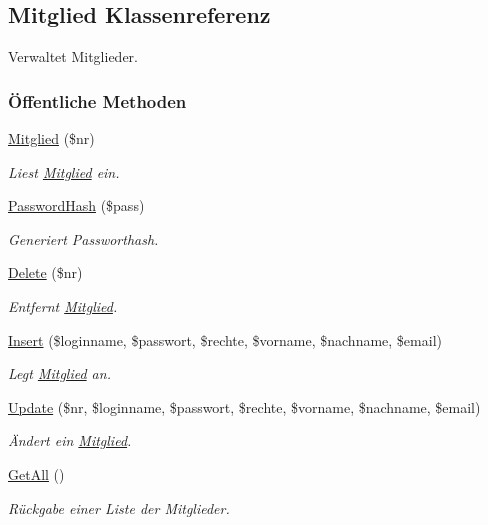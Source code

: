 \hypertarget{classMitglied}{
\subsection{Mitglied Klassenreferenz}
\label{classMitglied}
}
Verwaltet Mitglieder.  


\subsubsection*{\"{O}ffentliche Methoden}
\begin{CompactItemize}
\item 
\hyperlink{classMitglied_0ee18db6476bcb6d71d30978eb69c7ae}{Mitglied} (\$nr)
\begin{CompactList}\small\item\em Liest \hyperlink{classMitglied}{Mitglied} ein. \item\end{CompactList}\item 
\hyperlink{classMitglied_9b13db80866c22bf992e73f2eb75e369}{Password\-Hash} (\$pass)
\begin{CompactList}\small\item\em Generiert Passworthash. \item\end{CompactList}\item 
\hyperlink{classMitglied_c6900c12663e9b228bf9942fc045b8b4}{Delete} (\$nr)
\begin{CompactList}\small\item\em Entfernt \hyperlink{classMitglied}{Mitglied}. \item\end{CompactList}\item 
\hyperlink{classMitglied_5d9d5d087779303f002cbbcfcf1735c1}{Insert} (\$loginname, \$passwort, \$rechte, \$vorname, \$nachname, \$email)
\begin{CompactList}\small\item\em Legt \hyperlink{classMitglied}{Mitglied} an. \item\end{CompactList}\item 
\hyperlink{classMitglied_5bd2a31b6aeea5c69de9b6de825e11c2}{Update} (\$nr, \$loginname, \$passwort, \$rechte, \$vorname, \$nachname, \$email)
\begin{CompactList}\small\item\em Ändert ein \hyperlink{classMitglied}{Mitglied}. \item\end{CompactList}\item 
\hyperlink{classMitglied_70ce63c9c9a7159966dc9e80a7f726a2}{Get\-All} ()
\begin{CompactList}\small\item\em Rückgabe einer Liste der Mitglieder. \item\end{CompactList}\end{CompactItemize}
